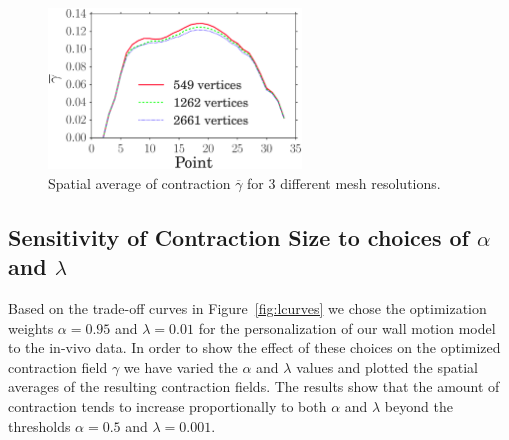 \begin{figure}[]
\includegraphics[width=0.6\textwidth]{mesh_conv_gamma}
\caption{Spatial average of contraction $\overline{\gamma}$ for 3 different mesh
  resolutions.}
\label{fig:mesh_conv_gamma}
\end{figure}


\subsection{Sensitivity of Contraction Size to choices of $\alpha$ and $\lambda$}
\label{sec:sense_alpha_lambda}
Based on the trade-off curves in Figure~\ref{fig:lcurves} we chose 
the optimization weights $\alpha = 0.95$ and $\lambda = 0.01$ for the personalization
of our wall motion model to the in-vivo data. In order to show the effect of these 
choices on the optimized contraction field $\gamma$ we have varied
the $\alpha$ and $\lambda$ values and plotted the spatial averages of the resulting
contraction fields. The results show that the amount of contraction tends to increase
proportionally to both $\alpha$ and $\lambda$ beyond the thresholds $\alpha = 0.5$ and
$\lambda = 0.001$. 

